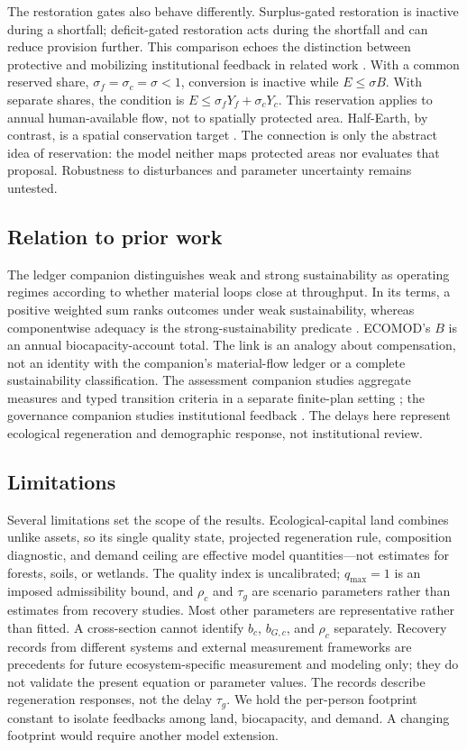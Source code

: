 The restoration gates also behave differently. Surplus-gated restoration is inactive during a shortfall; deficit-gated restoration acts during the shortfall and can reduce provision further. This comparison echoes the distinction between protective and mobilizing institutional feedback in related work \citep{Abaee2026a}. With a common reserved share, $\sigma_f=\sigma_c=\sigma<1$, conversion is inactive while $E\le\sigma B$. With separate shares, the condition is $E\le\sigma_fY_f+\sigma_cY_c$. This reservation applies to annual human-available flow, not to spatially protected area. Half-Earth, by contrast, is a spatial conservation target \citep{Wilson2016}. The connection is only the abstract idea of reservation: the model neither maps protected areas nor evaluates that proposal. Robustness to disturbances and parameter uncertainty remains untested.

\subsection{Relation to prior work}

The ledger companion distinguishes weak and strong sustainability as operating regimes according to whether material loops close at throughput. In its terms, a positive weighted sum ranks outcomes under weak sustainability, whereas componentwise adequacy is the strong-sustainability predicate \citep[Sections~1.1 and 10.1]{Abaee2026c}. ECOMOD's $B$ is an annual biocapacity-account total. The link is an analogy about compensation, not an identity with the companion's material-flow ledger or a complete sustainability classification. The assessment companion studies aggregate measures and typed transition criteria in a separate finite-plan setting \citep{Abaee2026b}; the governance companion studies institutional feedback \citep{Abaee2026a}. The delays here represent ecological regeneration and demographic response, not institutional review.

\subsection{Limitations}

Several limitations set the scope of the results. Ecological-capital land combines unlike assets, so its single quality state, projected regeneration rule, composition diagnostic, and demand ceiling are effective model quantities—not estimates for forests, soils, or wetlands. The quality index is uncalibrated; $q_{\max}=1$ is an imposed admissibility bound, and $\rho_c$ and $\tau_g$ are scenario parameters rather than estimates from recovery studies. Most other parameters are representative rather than fitted. A cross-section cannot identify $b_c$, $b_{G,c}$, and $\rho_c$ separately. Recovery records from different systems and external measurement frameworks are precedents for future ecosystem-specific measurement and modeling only; they do not validate the present equation or parameter values. The records describe regeneration responses, not the delay $\tau_g$. We hold the per-person footprint constant to isolate feedbacks among land, biocapacity, and demand. A changing footprint would require another model extension.

